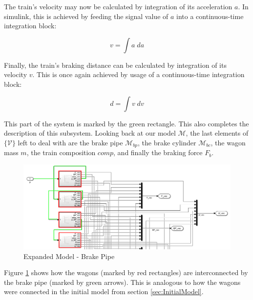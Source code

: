 \noindent
The train's velocity may now be calculated by integration of its acceleration $a$. In simulink, this is achieved by feeding the signal value of $a$ into a continuous-time integration block:

\begin{equation}
\label{eq:velocity}
v = \int a \; da
\end{equation}

\noindent
Finally, the train's braking distance can be calculated by integration of its velocity $v$. This is once again achieved by usage of a continuous-time integration block:

\begin{equation}
\label{eq:distance}
d = \int v \; dv
\end{equation}

\noindent
This part of the system is marked by the green rectangle. This also completes the description of this subsystem. Looking back at our model ${\mathcal{M}}$, the last elements of $\{{\mathcal{V}}\}$ left to deal with are the brake pipe ${\mathcal{M}}_{bp}$, the brake cylinder ${\mathcal{M}}_{bc}$, the wagon mass $m$, the train composition $comp$, and finally the braking force $F_{b}$.

\begin{figure}[H]
	\centering
	\includegraphics[width=\linewidth]{./pic/expandedmodel_brakepipe}
	\caption{Expanded Model - Brake Pipe}
	\label{fig:expandedmodel_brakepipe}
\end{figure}

\par\noindent
Figure \ref{fig:expandedmodel_brakepipe} shows how the wagons (marked by red rectangles) are interconnected by the brake pipe (marked by green arrows). This is analogous to how the wagons were connected in the initial model from section \ref{sec:InitialModel}.  

